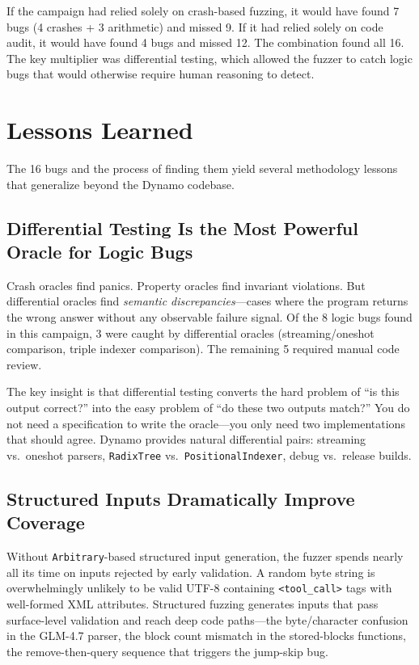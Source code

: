 \begin{insightbox}
If the campaign had relied solely on crash-based fuzzing, it would have found 7 bugs (4 crashes + 3 arithmetic) and missed 9. If it had relied solely on code audit, it would have found 4 bugs and missed 12. The combination found all 16. The key multiplier was differential testing, which allowed the fuzzer to catch logic bugs that would otherwise require human reasoning to detect.
\end{insightbox}

\section{Lessons Learned}
\label{sec:findings:lessons}

The 16 bugs and the process of finding them yield several methodology lessons that generalize beyond the Dynamo codebase.

\subsection{Differential Testing Is the Most Powerful Oracle for Logic Bugs}

Crash oracles find panics. Property oracles find invariant violations. But differential oracles find \emph{semantic discrepancies}---cases where the program returns the wrong answer without any observable failure signal. Of the 8 logic bugs found in this campaign, 3 were caught by differential oracles (streaming/oneshot comparison, triple indexer comparison). The remaining 5 required manual code review.

The key insight is that differential testing converts the hard problem of ``is this output correct?'' into the easy problem of ``do these two outputs match?'' You do not need a specification to write the oracle---you only need two implementations that should agree. Dynamo provides natural differential pairs: streaming vs.\ oneshot parsers, \texttt{RadixTree} vs.\ \texttt{PositionalIndexer}, debug vs.\ release builds.

\subsection{Structured Inputs Dramatically Improve Coverage}

%
Without \texttt{Arbitrary}-based structured input generation, the fuzzer spends nearly all its time on inputs rejected by early validation. A random byte string is overwhelmingly unlikely to be valid UTF-8 containing \texttt{<tool\_call>} tags with well-formed XML attributes. Structured fuzzing generates inputs that pass surface-level validation and reach deep code paths---the byte/character confusion in the GLM-4.7 parser, the block count mismatch in the stored-blocks functions, the remove-then-query sequence that triggers the jump-skip bug.

